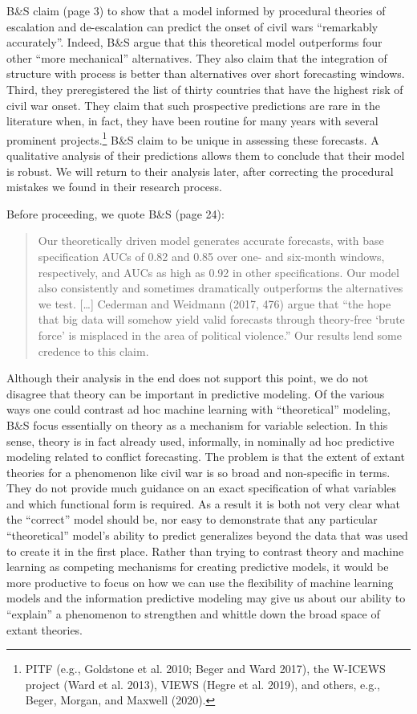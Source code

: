 \documentclass[
]{article}
\begin{document}
B\&S claim (page 3) to show that a model informed by procedural theories of escalation and de-escalation can predict the onset of civil wars ``remarkably accurately''. Indeed, B\&S argue that this theoretical model outperforms four other ``more mechanical'' alternatives. They also claim that the integration of structure with process is better than alternatives over short forecasting windows. Third, they preregistered the list of thirty countries that have the highest risk of civil war onset. They claim that such prospective predictions are rare in the literature when, in fact, they have been routine for many years with several prominent projects.\footnote{PITF (e.g., Goldstone et al. 2010; Beger and Ward 2017), the W-ICEWS project (Ward et al. 2013), VIEWS (Hegre et al. 2019), and others, e.g., Beger, Morgan, and Maxwell (2020).} B\&S claim to be unique in assessing these forecasts. A qualitative analysis of their predictions allows them to conclude that their model is robust. We will return to their analysis later, after correcting the procedural mistakes we found in their research process.

Before proceeding, we quote B\&S (page 24):

\begin{quote}
Our theoretically driven model generates accurate forecasts, with base specification AUCs of 0.82 and 0.85 over one- and six-month windows, respectively, and AUCs as high as 0.92 in other specifications. Our model also consistently and sometimes dramatically outperforms the alternatives we test. {[}\ldots{]} Cederman and Weidmann (2017, 476) argue that ``the hope that big data will somehow yield valid forecasts through theory-free `brute force' is misplaced in the area of political violence.'' Our results lend some credence to this claim.
\end{quote}

Although their analysis in the end does not support this point, we do not disagree that theory can be important in predictive modeling. Of the various ways one could contrast ad hoc machine learning with ``theoretical'' modeling, B\&S focus essentially on theory as a mechanism for variable selection. In this sense, theory is in fact already used, informally, in nominally ad hoc predictive modeling related to conflict forecasting. The problem is that the extent of extant theories for a phenomenon like civil war is so broad and non-specific in terms. They do not provide much guidance on an exact specification of what variables and which functional form is required. As a result it is both not very clear what the ``correct'' model should be, nor easy to demonstrate that any particular ``theoretical'' model's ability to predict generalizes beyond the data that was used to create it in the first place. Rather than trying to contrast theory and machine learning as competing mechanisms for creating predictive models, it would be more productive to focus on how we can use the flexibility of machine learning models and the information predictive modeling may give us about our ability to ``explain'' a phenomenon to strengthen and whittle down the broad space of extant theories.
\end{document}
